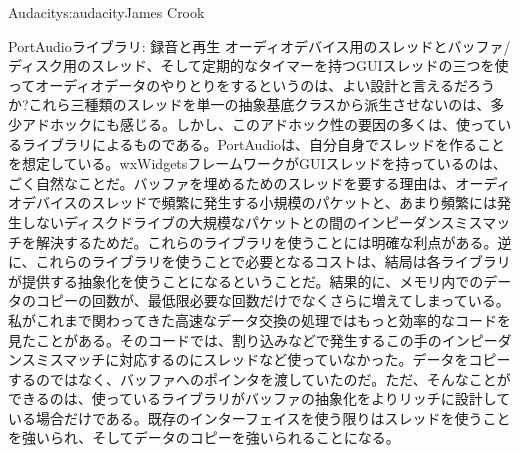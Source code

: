 \begin{aosachapter}{Audacity}{s:audacity}{James Crook}
\begin{aosasect1}{PortAudioライブラリ: 録音と再生}
オーディオデバイス用のスレッドとバッファ/ディスク用のスレッド、そして定期的なタイマーを持つGUIスレッドの三つを使ってオーディオデータのやりとりをするというのは、よい設計と言えるだろうか?これら三種類のスレッドを単一の抽象基底クラスから派生させないのは、多少アドホックにも感じる。しかし、このアドホック性の要因の多くは、使っているライブラリによるものである。PortAudioは、自分自身でスレッドを作ることを想定している。wxWidgetsフレームワークがGUIスレッドを持っているのは、ごく自然なことだ。バッファを埋めるためのスレッドを要する理由は、オーディオデバイスのスレッドで頻繁に発生する小規模のパケットと、あまり頻繁には発生しないディスクドライブの大規模なパケットとの間のインピーダンスミスマッチを解決するためだ。これらのライブラリを使うことには明確な利点がある。逆に、これらのライブラリを使うことで必要となるコストは、結局は各ライブラリが提供する抽象化を使うことになるということだ。結果的に、メモリ内でのデータのコピーの回数が、最低限必要な回数だけでなくさらに増えてしまっている。私がこれまで関わってきた高速なデータ交換の処理ではもっと効率的なコードを見たことがある。そのコードでは、割り込みなどで発生するこの手のインピーダンスミスマッチに対応するのにスレッドなど使っていなかった。データをコピーするのではなく、バッファへのポインタを渡していたのだ。ただ、そんなことができるのは、使っているライブラリがバッファの抽象化をよりリッチに設計している場合だけである。既存のインターフェイスを使う限りはスレッドを使うことを強いられ、そしてデータのコピーを強いられることになる。


\end{aosasect1}
\end{aosachapter}
